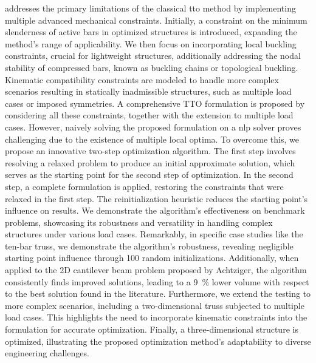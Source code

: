  addresses the primary limitations of the classical \gls{tto} method by implementing multiple advanced mechanical constraints. Initially, a constraint on the minimum slenderness of active bars in optimized structures is introduced, expanding the method's range of applicability. We then focus on incorporating local buckling constraints, crucial for lightweight structures, additionally addressing the nodal stability of compressed bars, known as buckling chains or topological buckling. Kinematic compatibility constraints are modeled to handle more complex scenarios resulting in statically inadmissible structures, such as multiple load cases or imposed symmetries. A comprehensive TTO formulation is proposed by considering all these constraints, together with the extension to multiple load cases. However, naively solving the proposed formulation on a \gls{nlp} solver proves challenging due to the existence of multiple local optima. To overcome this, we propose an innovative two-step optimization algorithm. The first step involves resolving a relaxed problem to produce an initial approximate solution, which serves as the starting point for the second step of optimization. In the second step, a complete formulation is applied, restoring the constraints that were relaxed in the first step. The reinitialization heuristic reduces the starting point's influence on results. We demonstrate the algorithm's effectiveness on benchmark problems, showcasing its robustness and versatility in handling complex structures under various load cases. Remarkably, in specific case studies like the ten-bar truss, we demonstrate the algorithm's robustness, revealing negligible starting point influence through 100 random initializations. Additionally, when applied to the 2D cantilever beam problem proposed by Achtziger, the algorithm consistently finds improved solutions, leading to a \qty{9}{\%} lower volume with respect to the best solution found in the literature. Furthermore, we extend the testing to more complex scenarios, including a two-dimensional truss subjected to multiple load cases. This highlights the need to incorporate kinematic constraints into the formulation for accurate optimization. Finally, a three-dimensional structure is optimized, illustrating the proposed optimization method's adaptability to diverse engineering challenges.

